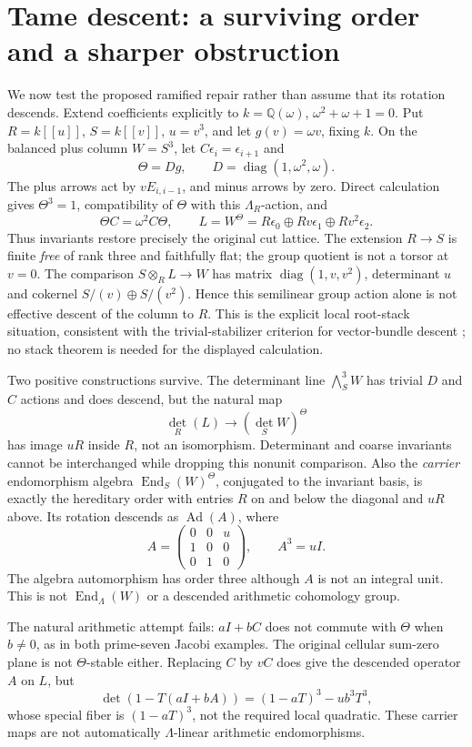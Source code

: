 \documentclass[11pt,oneside,openany]{book}
\theoremstyle{definition}\newtheorem{definition}[theorem]{Definition}
\theoremstyle{remark}\newtheorem{remark}[theorem]{Remark}
\begin{document}
\section{Tame descent: a surviving order and a sharper obstruction}
We now test the proposed ramified repair rather than assume that its rotation descends. Extend coefficients explicitly to $k=\mathbb Q(\omega)$, $\omega^2+\omega+1=0$. Put $R=k[[u]]$, $S=k[[v]]$, $u=v^3$, and let $g(v)=\omega v$, fixing $k$. On the balanced plus column $W=S^3$, let $C\epsilon_i=\epsilon_{i+1}$ and
\[
 \Theta=Dg,\qquad D=\operatorname{diag}(1,\omega^2,\omega).
\]
The plus arrows act by $vE_{i,i-1}$, and minus arrows by zero. Direct calculation gives $\Theta^3=1$, compatibility of $\Theta$ with this $\Lambda_R$-action, and
\[
 \Theta C=\omega^2C\Theta,\qquad
 L=W^\Theta=R\epsilon_0\oplus Rv\epsilon_1\oplus Rv^2\epsilon_2.
\]
Thus invariants restore precisely the original cut lattice. The extension $R\to S$ is finite \emph{free} of rank three and faithfully flat; the group quotient is not a torsor at $v=0$. The comparison $S\otimes_R L\to W$ has matrix $\operatorname{diag}(1,v,v^2)$, determinant $u$ and cokernel $S/(v)\oplus S/(v^2)$. Hence this semilinear group action alone is not effective descent of the column to $R$. This is the explicit local root-stack situation, consistent with the trivial-stabilizer criterion for vector-bundle descent \cite[Theorem10.3]{AlperDescent}; no stack theorem is needed for the displayed calculation.

Two positive constructions survive. The determinant line $\bigwedge_S^3W$ has trivial $D$ and $C$ actions and does descend, but the natural map
\[
 \det_R(L)\longrightarrow(\det_S W)^\Theta
\]
has image $uR$ inside $R$, not an isomorphism. Determinant and coarse invariants cannot be interchanged while dropping this nonunit comparison. Also the \emph{carrier} endomorphism algebra $\operatorname{End}_S(W)^\Theta$, conjugated to the invariant basis, is exactly the hereditary order with entries $R$ on and below the diagonal and $uR$ above. Its rotation descends as $\operatorname{Ad}(A)$, where
\[
 A=\begin{pmatrix}0&0&u\\1&0&0\\0&1&0\end{pmatrix},\qquad A^3=uI.
\]
The algebra automorphism has order three although $A$ is not an integral unit. This is not $\operatorname{End}_\Lambda(W)$ or a descended arithmetic cohomology group.

The natural arithmetic attempt fails: $aI+bC$ does not commute with $\Theta$ when $b\ne0$, as in both prime-seven Jacobi examples. The original cellular sum-zero plane is not $\Theta$-stable either. Replacing $C$ by $vC$ does give the descended operator $A$ on $L$, but
\[
 \det(1-T(aI+bA))=(1-aT)^3-ub^3T^3,
\]
whose special fiber is $(1-aT)^3$, not the required local quadratic. These carrier maps are not automatically $\Lambda$-linear arithmetic endomorphisms.
\end{document}
